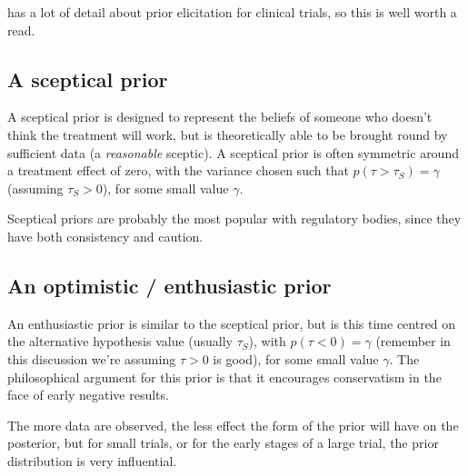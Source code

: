 \documentclass[
  openany]{book}
\theoremstyle{definition}
\theoremstyle{definition}
\theoremstyle{definition}
\theoremstyle{definition}
\theoremstyle{remark}
\begin{document}
\citet{spiegelhalter2004bayesian} has a lot of detail about prior elicitation for clinical trials, so this is well worth a read.

\subsection*{A sceptical prior}\label{a-sceptical-prior}

A sceptical prior is designed to represent the beliefs of someone who doesn't think the treatment will work, but is theoretically able to be brought round by sufficient data (a \emph{reasonable} sceptic). A sceptical prior is often symmetric around a treatment effect of zero, with the variance chosen such that \(p\left(\tau>\tau_S\right) = \gamma\) (assuming \(\tau_S>0\)), for some small value \(\gamma\).

Sceptical priors are probably the most popular with regulatory bodies, since they have both consistency and caution.

\subsection*{An optimistic / enthusiastic prior}\label{an-optimistic-enthusiastic-prior}

An enthusiastic prior is similar to the sceptical prior, but is this time centred on the alternative hypothesis value (usually \(\tau_S\)), with \(p\left(\tau<0\right) = \gamma\) (remember in this discussion we're assuming \(\tau>0\) is good), for some small value \(\gamma\). The philosophical argument for this prior is that it encourages conservatism in the face of early negative results.

The more data are observed, the less effect the form of the prior will have on the posterior, but for small trials, or for the early stages of a large trial, the prior distribution is very influential.
\end{document}
